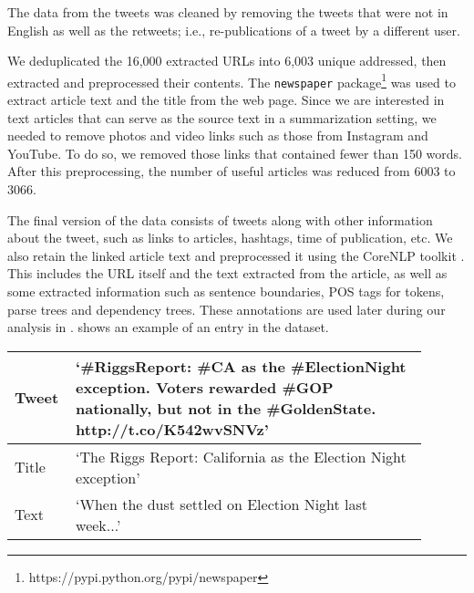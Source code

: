 The data from the tweets was cleaned by removing the tweets that were not in English as well as the retweets; i.e., re-publications of a tweet by a different user. 

We deduplicated the 16,000 extracted URLs into 6,003 unique addressed, then extracted and preprocessed their contents. The \texttt{newspaper} package\footnote{https://pypi.python.org/pypi/newspaper} was used to extract article text and the title from the web page. Since we are interested in text articles that can serve as the source text in a summarization setting, we needed to remove photos and video links such as those from Instagram and YouTube. To do so, we removed those links that contained fewer than 150 words.  After this preprocessing, the number of useful articles was reduced from 6003 to 3066.

The final version of the data consists of tweets along with other information about the tweet, such as links to articles, hashtags, time of publication, etc. We also retain the linked article text and preprocessed it using the CoreNLP toolkit \cite{manning2014stanford}. This includes the URL itself and the text extracted from the article, as well as some extracted information such as sentence boundaries, POS tags for tokens, parse trees and dependency trees. These annotations are used later during our analysis in .  shows an example of an entry in the dataset.


\begin{table}[htbp]
\centering
\begin{tabular}{|p{0.1\linewidth}|p{0.8\linewidth}|}
\hline
Tweet & `\#RiggsReport: \#CA as the \#ElectionNight exception. Voters rewarded \#GOP nationally, but not in the \#GoldenState. http://t.co/K542wvSNVz' \\ \hline
Title & `The Riggs Report: California as the Election Night exception'                                                                                 \\ \hline
Text  & `When the dust settled on Election Night last week...'                                                                                         \\ \hline
\end{tabular}
\label{tab:ex1}
\end{table}